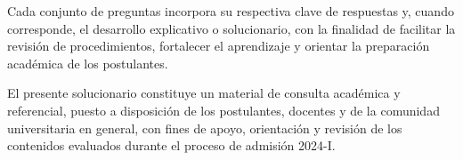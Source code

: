  
Cada conjunto de preguntas incorpora su respectiva clave de respuestas y, cuando
corresponde, el desarrollo explicativo o solucionario, con la finalidad de
facilitar la revisión de procedimientos, fortalecer el aprendizaje y orientar la
preparación académica de los postulantes.

El presente solucionario constituye un material de consulta académica y referencial,
puesto a disposición de los postulantes, docentes y de la
comunidad universitaria en general, con fines de apoyo, orientación y revisión
de los contenidos evaluados durante el proceso de admisión 2024-I.



\newpage
\mbox{}               %
\newpage
